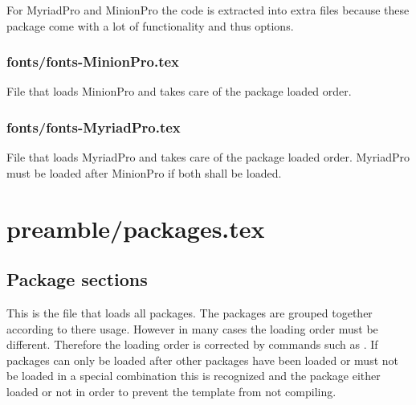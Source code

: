 For MyriadPro and MinionPro the code is extracted into extra files %
because these package come with a lot of functionality and thus options.


\subsubsection{fonts/fonts-MinionPro.tex}
File that loads MinionPro and takes care of the package loaded order.


\subsubsection{fonts/fonts-MyriadPro.tex}
File that loads MyriadPro and takes care of the package loaded order. MyriadPro must be loaded after MinionPro if both shall be loaded.


\section{preamble/packages.tex}

\subsection{Package sections}

This is the file that loads all packages. The packages are grouped together according to there usage. However in many cases the loading order must be different. Therefore the loading order is corrected by commands such as . If packages can only be loaded after other packages have been loaded or must not be loaded in a special combination this is recognized and the package either loaded or not in order to prevent the template from not compiling. 


